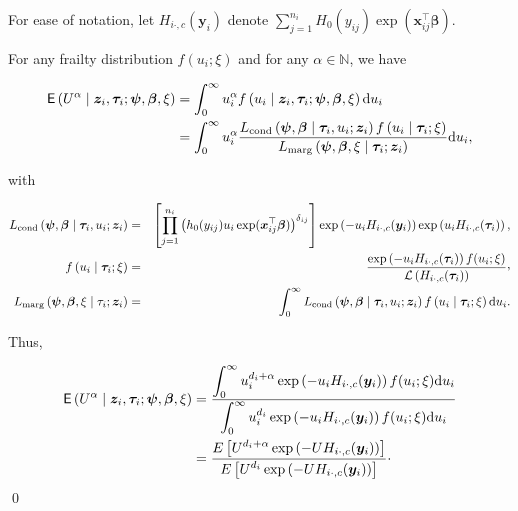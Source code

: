 For ease of notation, let $H_{i\cdot,c}(\bm y_i)$ denote 
  $\sum_{j=1}^{n_i} H_0 ( y_{ij} ) \exp ( \bm x^\top_{ij} \bm\beta )$.

For any frailty distribution $f(u_i; \xi)$ and for any $\alpha \in \mathbb N$, we have
  
\begin{align*}
\mathsf{E} \left( U^\alpha \mid \bm z_i, \bm \tau_i ; \bm\psi, \bm\beta, \xi \right) 
  &= \int_0^\infty u_i^\alpha f \left( u_i \mid \bm z_i, \bm \tau_i ; \bm\psi, \bm\beta, \xi \right) \mathrm d u_i \\
  &=  \int_0^\infty u_i^\alpha \frac{L_{\mathrm{cond}} \left( \bm\psi, \bm\beta \mid \bm \tau_i, u_i; \bm z_i \right) f \left( u_i \mid \bm \tau_i ; \xi \right) }
      {L_{\mathrm{marg}} \left( \bm\psi, \bm\beta, \xi \mid \bm \tau_i ; \bm z_i \right)} \mathrm d u_i,
\end{align*}

with

\begin{eqnarray*}
L_{\mathrm{cond}} \left( \bm\psi, \bm\beta \mid \bm \tau_i, u_i; \bm z_i \right) & = & \left[ \prod_{j=1}^{n_i} \left( h_0 ( y_{ij} ) u_i \exp ( \bm x^\top_{ij} \bm\beta ) \right)^{\delta_{ij}} \right]  \exp \left( - u_i  H_{i\cdot,c}(\bm y_i) \right) \exp \left( u_i  H_{i\cdot,c}(\bm \tau_i)  \right), \\
f \left( u_i \mid \bm \tau_i ; \xi \right) & = & \frac{\exp \left( -u_i  H_{i\cdot,c}(\bm \tau_i)  \right) f(u_{i}; \xi)}{\mathcal{L} \left(H_{i\cdot,c}(\bm \tau_i)\right)}\ccom \\
L_{\mathrm{marg}} \left( \bm\psi, \bm\beta, \xi \mid \tau_i ; \bm z_i \right) & = & \int_{0}^{\infty} L_{\mathrm{cond}} \left( \bm\psi, \bm\beta \mid \bm \tau_i, u_i; \bm z_i \right) f \left( u_i \mid \bm \tau_i ; \xi \right) \mathrm du_{i}.
\end{eqnarray*}

Thus,

\begin{align*}
\mathsf{E} \left( U^\alpha \mid \bm z_i, \bm \tau_i ; \bm\psi, \bm\beta, \xi \right)
 &= \frac{\displaystyle \int_0^\infty u_i^{d_i + \alpha} \exp \left( - u_i  H_{i\cdot,c}(\bm y_i) \right) f(u_i ; \xi) \mathrm d u_i}
        {\displaystyle \int_0^\infty u_i^{d_i} \exp \left( - u_i  H_{i\cdot,c}(\bm y_i) \right) f(u_i ; \xi) \mathrm d u_i} \\
   &= \frac{\displaystyle E \left[ U^{d_i + \alpha} \exp \left( -U  H_{i\cdot,c}(\bm y_i) \right) \right]}{\displaystyle E \left[ U^{d_i} \exp \left( -U  H_{i\cdot,c}(\bm y_i) \right) \right]}\cdot
\end{align*}
\qed